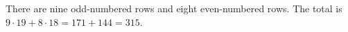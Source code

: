 There are nine odd-numbered rows and eight even-numbered rows. The total is $9\cdot19+8\cdot18=171+144=\boxed{315}$.
